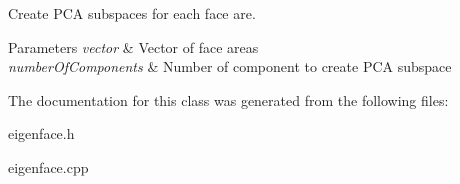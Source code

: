 Create P\+C\+A subspaces for each face are. 


\begin{DoxyParams}{Parameters}
{\em vector} & Vector of face areas \\
\hline
{\em number\+Of\+Components} & Number of component to create P\+C\+A subspace \\
\hline
\end{DoxyParams}


The documentation for this class was generated from the following files\+:\begin{DoxyCompactItemize}
\item 
eigenface.\+h\item 
eigenface.\+cpp\end{DoxyCompactItemize}
